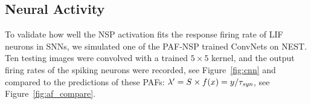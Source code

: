 	\subsection{Neural Activity}
	To validate how well the NSP activation fits \DIFdelbegin {}\DIFdelend the response firing rate of LIF neurons in SNNs, we simulated one of the PAF-NSP trained ConvNets on NEST.
	Ten testing images were convolved with a trained $5\times5$ kernel, and the output firing rates of the spiking neurons were recorded, see Figure~\ref{fig:cnn} and compared to the predictions of these PAFs: $\lambda' = S \times f(x) = y/\tau_{\textit{\textrm{syn}}}$, see Figure~\ref{fig:af_compare}.

